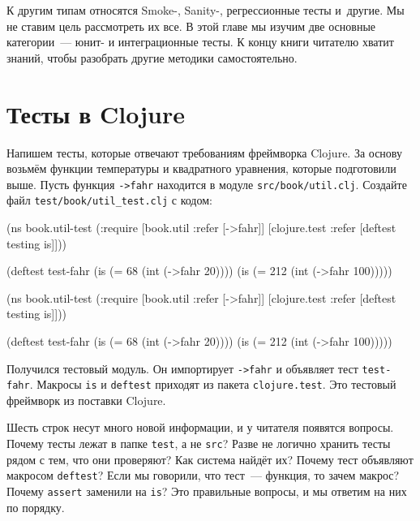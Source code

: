 К другим типам относятся Smoke-, Sanity-, регрессионные тесты и~другие. Мы не
ставим цель рассмотреть их все. В этой главе мы изучим две основные
категории~--- юнит- и интеграционные тесты. К концу книги читателю хватит
знаний, чтобы разобрать другие методики самостоятельно.

\section{Тесты в Clojure}

Напишем тесты, которые отвечают требованиям фреймворка Clojure. За основу
возьмём функции температуры и квадратного уравнения, которые подготовили
выше. Пусть функция \verb|->fahr| находится в модуле
\texttt{src/book/util\-.clj}. Создайте файл \verb|test/book/util_test.clj| с кодом:


\ifnarrow

\begin{english}
  \begin{clojure}
(ns book.util-test
  (:require
   [book.util :refer [->fahr]]
   [clojure.test :refer
    [deftest testing is]]))

(deftest test-fahr
  (is (= 68 (int (->fahr 20))))
  (is (= 212 (int (->fahr 100)))))
  \end{clojure}
\end{english}

\else

\begin{english}
  \begin{clojure}
(ns book.util-test
  (:require
    [book.util :refer [->fahr]]
    [clojure.test :refer [deftest testing is]]))

(deftest test-fahr
  (is (= 68 (int (->fahr 20))))
  (is (= 212 (int (->fahr 100)))))
  \end{clojure}
\end{english}

\fi

Получился тестовый модуль. Он импортирует \verb|->fahr| и объявляет тест
\verb|test-fahr|. Макросы \verb|is| и \verb|deftest| приходят из пакета
\verb|clojure.test|. Это тестовый фреймворк из поставки Clojure.

Шесть строк несут много новой информации, и у читателя появятся вопросы. Почему
тесты лежат в папке \verb|test|, а не \verb|src|? Разве не логично хранить тесты
рядом с тем, что они проверяют? Как система найдёт их?  Почему тест объявляют
макросом \verb|deftest|? Если мы говорили, что тест~--- функция, то зачем
макрос? Почему \verb|assert| заменили на \verb|is|? Это правильные вопросы, и мы
ответим на них по порядку.


